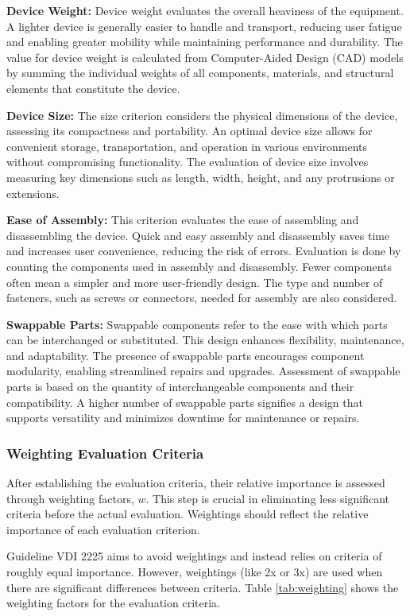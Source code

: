 \textbf{Device Weight:} Device weight evaluates the overall heaviness of the equipment. A lighter device is generally easier to handle and transport, reducing user fatigue and enabling greater mobility while maintaining performance and durability. The value for device weight is calculated from Computer-Aided Design (CAD) models by summing the individual weights of all components, materials, and structural elements that constitute the device.

\textbf{Device Size:} The size criterion considers the physical dimensions of the device, assessing its compactness and portability. An optimal device size allows for convenient storage, transportation, and operation in various environments without compromising functionality. The evaluation of device size involves measuring key dimensions such as length, width, height, and any protrusions or extensions.

\textbf{Ease of Assembly:} This criterion evaluates the ease of assembling and disassembling the device. Quick and easy assembly and disassembly saves time and increases user convenience, reducing the risk of errors. Evaluation is done by counting the components used in assembly and disassembly. Fewer components often mean a simpler and more user-friendly design. The type and number of fasteners, such as screws or connectors, needed for assembly are also considered.

\textbf{Swappable Parts:} Swappable components refer to the ease with which parts can be interchanged or substituted. This design enhances flexibility, maintenance, and adaptability. The presence of swappable parts encourages component modularity, enabling streamlined repairs and upgrades. Assessment of swappable parts is based on the quantity of interchangeable components and their compatibility. A higher number of swappable parts signifies a design that supports versatility and minimizes downtime for maintenance or repairs.

\subsubsection{Weighting Evaluation Criteria}
After establishing the evaluation criteria, their relative importance is assessed through weighting factors, $w$. This step is crucial in eliminating less significant criteria before the actual evaluation. Weightings should reflect the relative importance of each evaluation criterion.

Guideline VDI 2225 aims to avoid weightings and instead relies on criteria of roughly equal importance. However, weightings (like 2x or 3x) are used when there are significant differences between criteria.
Table \ref{tab:weighting} shows the weighting factors for the evaluation criteria.

